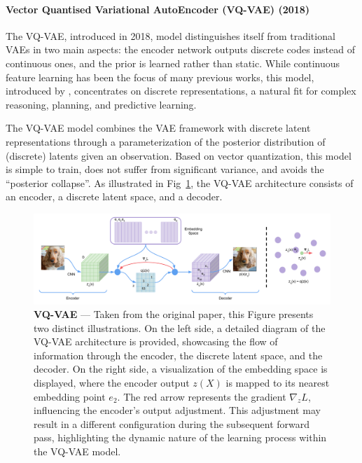 \paragraph{Vector Quantised Variational AutoEncoder (VQ-VAE) (2018)} \label{sec:vq-vae}

The \acf{VQ-VAE}, introduced in 2018, model distinguishes itself from traditional \acp{VAE} in two main aspects: the encoder network outputs discrete codes instead of continuous ones, and the prior is learned rather than static. While continuous feature learning has been the focus of many previous works, this model, introduced by \cite{oord_neural_2018}, concentrates on discrete representations, a natural fit for complex reasoning, planning, and predictive learning.

The \ac{VQ-VAE} model combines the \ac{VAE} framework with discrete latent representations through a parameterization of the posterior distribution of (discrete) latents given an observation. Based on vector quantization, this model is simple to train, does not suffer from significant variance, and avoids the ``posterior collapse''. As illustrated in Fig~\ref{fig:vq-vae}, the \ac{VQ-VAE} architecture consists of an encoder, a discrete latent space, and a decoder.

\begin{figure}[ht]
    \centering
    \includegraphics[width=\textwidth]{figures/2-sota/vq-vae.png}
    \caption[VQ-VAE]{\textbf{VQ-VAE} --- Taken from the original paper, this Figure presents two distinct illustrations. On the left side, a detailed diagram of the \ac{VQ-VAE} architecture is provided, showcasing the flow of information through the encoder, the discrete latent space, and the decoder. On the right side, a visualization of the embedding space is displayed, where the encoder output $z(X)$ is mapped to its nearest embedding point $e_2$. The red arrow represents the gradient $\nabla_z L$, influencing the encoder's output adjustment. This adjustment may result in a different configuration during the subsequent forward pass, highlighting the dynamic nature of the learning process within the \ac{VQ-VAE} model.}
    \label{fig:vq-vae}
\end{figure}


